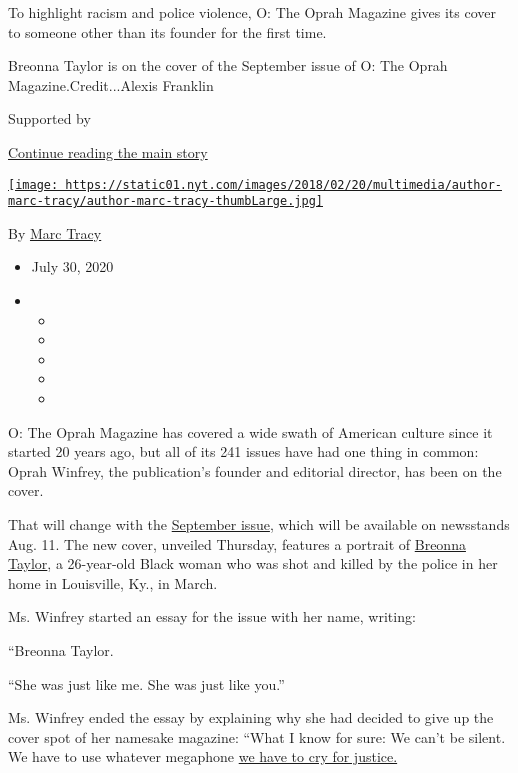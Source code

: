 To highlight racism and police violence, O: The Oprah Magazine gives its
cover to someone other than its founder for the first time.

Breonna Taylor is on the cover of the September issue of O: The Oprah
Magazine.Credit...Alexis Franklin

Supported by

\protect\hyperlink{after-sponsor}{Continue reading the main story}

\href{https://www.nytimes.com/by/marc-tracy}{\texttt{[image: https://static01.nyt.com/images/2018/02/20/multimedia/author-marc-tracy/author-marc-tracy-thumbLarge.jpg]}}

By \href{https://www.nytimes.com/by/marc-tracy}{Marc Tracy}

\begin{itemize}
\item
  July 30, 2020
\item
  \begin{itemize}
  \item
  \item
  \item
  \item
  \item
  \end{itemize}
\end{itemize}

O: The Oprah Magazine has covered a wide swath of American culture since
it started 20 years ago, but all of its 241 issues have had one thing in
common: Oprah Winfrey, the publication's founder and editorial director,
has been on the cover.

That will change with the
\href{https://www.oprahmag.com/life/a33449982/oprah-breonna-taylor/}{September
issue}, which will be available on newsstands Aug. 11. The new cover,
unveiled Thursday, features a portrait of
\href{https://www.nytimes.com/article/breonna-taylor-police.html}{Breonna
Taylor}, a 26-year-old Black woman who was shot and killed by the police
in her home in Louisville, Ky., in March.

Ms. Winfrey started an essay for the issue with her name, writing:

``Breonna Taylor.

``She was just like me. She was just like you.''

Ms. Winfrey ended the essay by explaining why she had decided to give up
the cover spot of her namesake magazine: ``What I know for sure: We
can't be silent. We have to use whatever megaphone
\href{https://www.oprahmag.com/life/a32838616/white-privilege-lesson-black-lives-matter-movement/}{we
have to cry for justice.}

